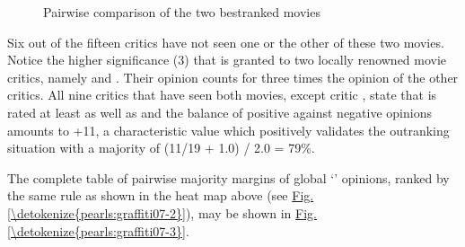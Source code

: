 \documentclass[a4paper,12pt,english]{sphinxhowto}
\let\sphinxpxdimen\pdfpxdimen\else\newdimen\sphinxpxdimen
\begin{document}
\begin{sphinxVerbatim}[commandchars=\\\{\},numbers=left,firstnumber=1,stepnumber=1]
   
  
 
\end{sphinxVerbatim}

\begin{figure}[H]
\centering
\capstart

\noindent\sphinxincludegraphics[width=600\sphinxpxdimen]{{graffiti07_45}.png}
\caption{Pairwise comparison of the two best\sphinxhyphen{}ranked movies}\label{\detokenize{pearls:graffiti07-45}}\end{figure}

\sphinxAtStartPar
Six out of the fifteen critics have not seen one or the other of these two movies. Notice the higher significance (3) that is granted to two locally renowned movie critics, namely  and . Their opinion counts for three times the opinion of the other critics. All nine critics that have seen both movies, except critic , state that  is rated at least as well as  and the balance of positive against negative opinions amounts to +11, a characteristic value which positively validates the outranking situation with a majority of (11/19 + 1.0) / 2.0 = 79\%.

\sphinxAtStartPar
The complete table of pairwise majority margins of global ‘’ opinions, ranked by the same rule as shown in the
heat map above (see \hyperref[\detokenize{pearls:graffiti07-2}]{Fig.\@ \ref{\detokenize{pearls:graffiti07-2}}}), may be shown in \hyperref[\detokenize{pearls:graffiti07-3}]{Fig.\@ \ref{\detokenize{pearls:graffiti07-3}}}.
\end{document}
